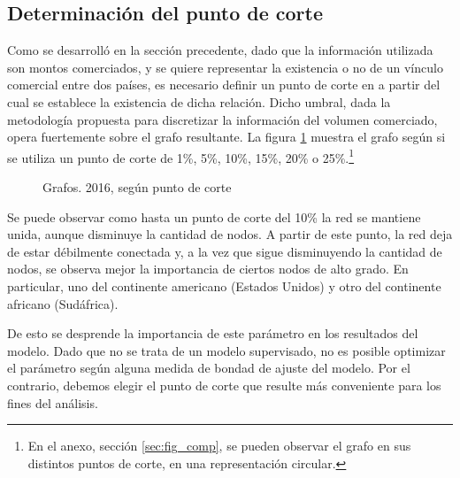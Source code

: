 \documentclass[class=article, crop=false]{standalone}
\begin{document}
\subsection{Determinación del punto de corte}

Como se desarrolló en la sección precedente, dado que la información utilizada son montos comerciados, y se quiere representar la existencia o no de un vínculo comercial entre dos países, es necesario definir un punto de corte en a partir del cual se establece la existencia de dicha relación. 
Dicho umbral, dada la metodología propuesta para discretizar la información del volumen comerciado, opera fuertemente sobre el grafo resultante. La figura \ref{fig:grafo_2016} muestra el grafo según si se utiliza un punto de corte de 1\%, 5\%, 10\%, 15\%, 20\% o 25\%.\footnote{En el anexo, sección \ref{sec:fig_comp}, se pueden observar el grafo en sus distintos puntos de corte, en una representación circular. }

\begin{figure}
	\centering
	\caption{Grafos. 2016, según punto de corte}
	\label{fig:grafo_2016}
\end{figure}

Se puede observar como hasta un punto de corte del 10\% la red se mantiene unida, aunque disminuye la cantidad de nodos. A partir de este punto, la red deja de estar débilmente conectada y, a la vez que sigue disminuyendo la cantidad de nodos, se observa mejor la importancia de ciertos nodos de alto grado. En particular, uno del continente americano (Estados Unidos) y otro del continente africano (Sudáfrica).


De esto se desprende la importancia de este parámetro en los resultados del modelo. Dado que no se trata de un modelo supervisado, no es posible optimizar el parámetro según alguna medida de bondad de ajuste del modelo. Por el contrario, debemos elegir el punto de corte que resulte más conveniente para los fines del análisis. 
\end{document}
